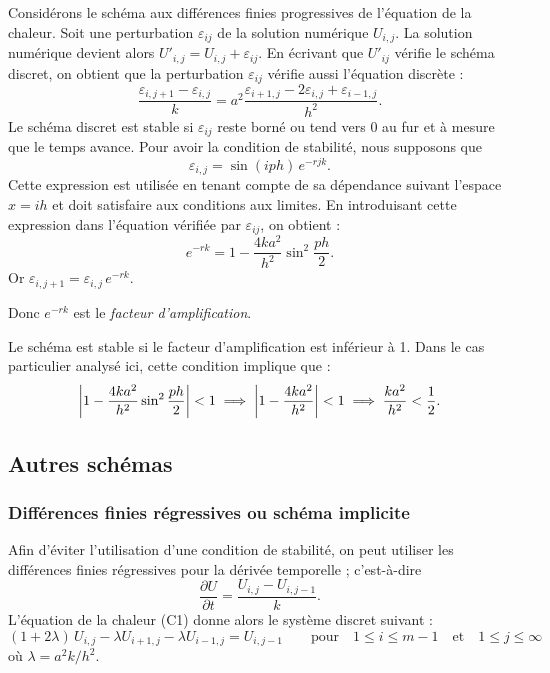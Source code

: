 Considérons le schéma aux différences finies progressives de l'équation de la
chaleur. Soit une perturbation $\varepsilon_{ij}$ de la solution numérique
$U_{i,j}$. La solution numérique devient alors
$U'_{i,j} = U_{i,j} + \varepsilon_{ij}$. En écrivant que $U'_{ij}$ vérifie le
schéma discret, on obtient que la perturbation $\varepsilon_{ij}$ vérifie
aussi l'équation discrète :
\[
  \frac{\varepsilon_{i,j+1} - \varepsilon_{i,j}}{k}
  = a^2\frac{\varepsilon_{i+1,j} - 2\varepsilon_{i,j} + \varepsilon_{i-1,j}}{h^2} .
\]
Le schéma discret est stable si $\varepsilon_{ij}$ reste borné ou tend vers 0
au fur et à mesure que le temps avance. Pour avoir la condition de stabilité,
nous supposons que
\[
  \varepsilon_{i,j} = \sin(iph)\,e^{-rjk} .
\]
Cette expression est utilisée en tenant compte de sa dépendance suivant
l'espace $x = ih$ et doit satisfaire aux conditions aux limites. En
introduisant cette expression dans l'équation vérifiée par $\varepsilon_{ij}$,
on obtient :
\[
  e^{-rk} = 1 - \frac{4ka^2}{h^2}\sin^2\frac{ph}{2} .
\]
Or $\varepsilon_{i,j+1} = \varepsilon_{i,j}\,e^{-rk}$.

Donc $e^{-rk}$ est le \emph{facteur d'amplification}.

Le schéma est stable si le facteur d'amplification est inférieur à 1. Dans le
cas particulier analysé ici, cette condition implique que :
\[
  \left|1 - \frac{4ka^2}{h^2}\sin^2\frac{ph}{2}\right| < 1
  \;\Longrightarrow\;
  \left|1 - \frac{4ka^2}{h^2}\right| < 1
  \;\Longrightarrow\;
  \frac{ka^2}{h^2} < \frac{1}{2} .
\]

\subsection{Autres schémas}

\subsubsection{Différences finies régressives ou schéma implicite}

Afin d'éviter l'utilisation d'une condition de stabilité, on peut utiliser les
différences finies régressives pour la dérivée temporelle ; c'est-à-dire
\begin{equation}
  \frac{\partial U}{\partial t} = \frac{U_{i,j} - U_{i,j-1}}{k} .
  \tag{C4}
\end{equation}
L'équation de la chaleur (C1) donne alors le système discret suivant :
\begin{equation}
  (1 + 2\lambda)\,U_{i,j} - \lambda U_{i+1,j} - \lambda U_{i-1,j} = U_{i,j-1}
  \qquad\text{pour}\quad 1 \le i \le m-1 \quad\text{et}\quad 1 \le j \le \infty
  \tag{C5}
\end{equation}
où $\lambda = a^2k/h^2$.

